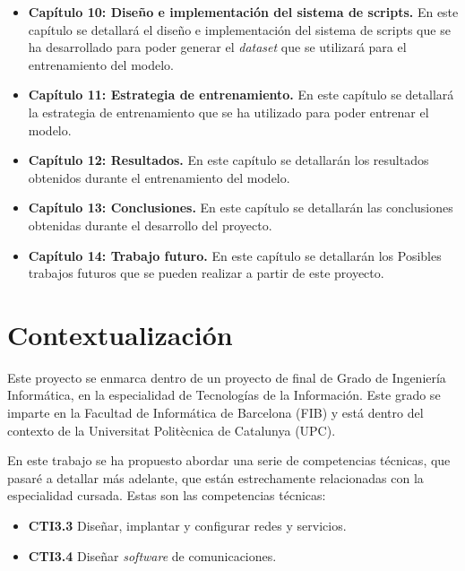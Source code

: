 \begin{itemize}
        estos modelos utilizando modelos online tipo ChatGPT\footnote{ChatGPT es una aplicación
        de chatbot de inteligencia artificial desarrollado en 2022 por OpenAI que se especializa
        en el diálogo.}.
    \item \textbf{Capítulo 10: Diseño e implementación del sistema de scripts.} En este
        capítulo se detallará el diseño e implementación del sistema de scripts que se
        ha desarrollado para poder generar el \textit{dataset} que se utilizará para el
        entrenamiento del modelo.
    \item \textbf{Capítulo 11: Estrategia de entrenamiento.} En este capítulo se detallará
        la estrategia de entrenamiento que se ha utilizado para poder entrenar el modelo.
    \item \textbf{Capítulo 12: Resultados.} En este capítulo se detallarán los resultados
        obtenidos durante el entrenamiento del modelo.
    \item \textbf{Capítulo 13: Conclusiones.} En este capítulo se detallarán las conclusiones
        obtenidas durante el desarrollo del proyecto.
    \item \textbf{Capítulo 14: Trabajo futuro.} En este capítulo se detallarán los Posibles
        trabajos futuros que se pueden realizar a partir de este proyecto.
\end{itemize}

\section{Contextualización}
\label{sec:contextualizacion}


Este proyecto se enmarca dentro de un proyecto de final de Grado de Ingeniería
Informática, en la especialidad de Tecnologías de la Información. Este grado se
imparte en la Facultad de Informática de Barcelona (FIB) y está dentro del contexto
de la Universitat Politècnica de Catalunya (UPC).

En este trabajo se ha propuesto abordar una serie de competencias técnicas, que
pasaré a detallar más adelante, que están estrechamente relacionadas con la
especialidad cursada. Estas son las competencias técnicas:

\begin{itemize}
    \item \textbf{CTI3.3} Diseñar, implantar y configurar redes y servicios.
    \item \textbf{CTI3.4} Diseñar \textit{software} de comunicaciones.
\end{itemize}

